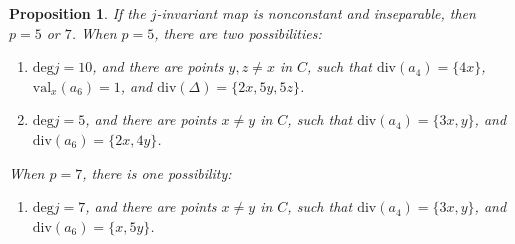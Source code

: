 \documentclass[11pt, letterpaper]{amsart}
\theoremstyle{plain}
\newtheorem{proposition}[theorem]{Proposition}
\theoremstyle{definition}
\renewcommand{\deg}{\mathrm{deg}}
\newcommand{\<}{\langle}
\renewcommand{\>}{\rangle}
\renewcommand{\div}{\mathrm{div}}
\begin{document}
\begin{proposition}
\label{prop: inspearable j}
    If the $j$-invariant map is nonconstant and inseparable, then $p = 5$ or $7$. When $p = 5$, there are two possibilities: 
    \begin{enumerate}[label=\upshape{(\roman*)}]
        \item $\deg j = 10$, and there are points $y, z \neq x$ in $C$, such that $\mathrm{div}(a_4) = \{4x \}$, $\mathrm{val}_x(a_6) = 1$, and $\mathrm{div}(\Delta) = \{2x, 5y,  5z\}$. 
        \item $\deg j = 5$, and there are points $x \neq y$ in $C$, such that $\div(a_4) = \{ 3x, y \}$, and $\div(a_6) = \{ 2x, 4y \}$.  
    \end{enumerate}
    When $p = 7$, there is one possibility: 
    \begin{enumerate}
        \item[\upshape{(iii)}] $\deg j = 7$, and there are points $x \neq y$ in $C$, such that $\div(a_4) = \{ 3x, y \}$, and $\div(a_6) = \{ x, 5y \}$. 
    \end{enumerate}
\end{proposition}
\end{document}
